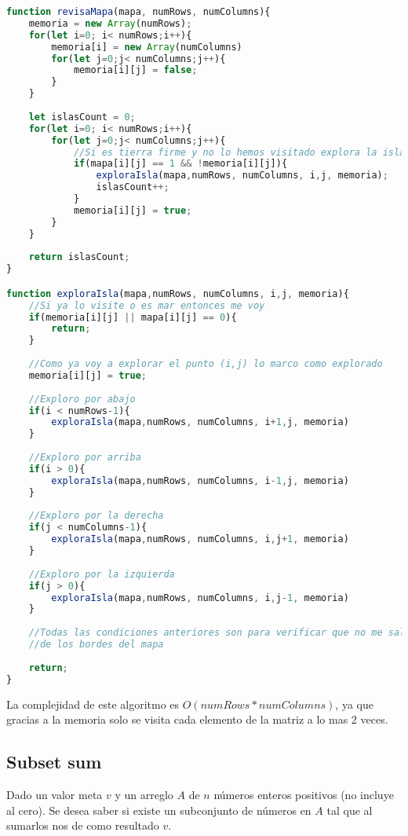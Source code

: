 \begin{lstlisting}[language=JavaScript, caption=Contar islas]
function revisaMapa(mapa, numRows, numColumns){
    memoria = new Array(numRows);
    for(let i=0; i< numRows;i++){
        memoria[i] = new Array(numColumns)
        for(let j=0;j< numColumns;j++){
            memoria[i][j] = false;
        }     
    }
    
    let islasCount = 0;
    for(let i=0; i< numRows;i++){
        for(let j=0;j< numColumns;j++){
            //Si es tierra firme y no lo hemos visitado explora la isla
            if(mapa[i][j] == 1 && !memoria[i][j]){
                exploraIsla(mapa,numRows, numColumns, i,j, memoria);
                islasCount++;
            }
            memoria[i][j] = true;
        }        
    }
    
    return islasCount;
}

function exploraIsla(mapa,numRows, numColumns, i,j, memoria){
    //Si ya lo visite o es mar entonces me voy
    if(memoria[i][j] || mapa[i][j] == 0){
        return;
    }
    
    //Como ya voy a explorar el punto (i,j) lo marco como explorado
    memoria[i][j] = true;
    
    //Exploro por abajo
    if(i < numRows-1){
        exploraIsla(mapa,numRows, numColumns, i+1,j, memoria)
    }
    
    //Exploro por arriba
    if(i > 0){
        exploraIsla(mapa,numRows, numColumns, i-1,j, memoria)
    }
    
    //Exploro por la derecha 
    if(j < numColumns-1){
        exploraIsla(mapa,numRows, numColumns, i,j+1, memoria)
    }
    
    //Exploro por la izquierda
    if(j > 0){
        exploraIsla(mapa,numRows, numColumns, i,j-1, memoria)
    }
    
    //Todas las condiciones anteriores son para verificar que no me salga
    //de los bordes del mapa
    
    return;
}
\end{lstlisting}

 La complejidad de este algoritmo es $O(numRows * numColumns)$, ya que gracias a la memoria solo se visita cada elemento de la matriz a lo mas 2 veces. 
 
  
 \subsection{Subset sum}

Dado un valor meta $v$ y un arreglo $A$ de $n$ números enteros positivos (no incluye al cero). Se desea saber si existe un subconjunto de números en $A$ tal que al sumarlos nos de como resultado $v$.


